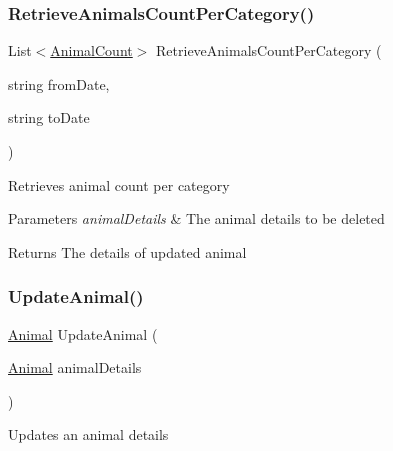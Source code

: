 \subsubsection{\texorpdfstring{Retrieve\+Animals\+Count\+Per\+Category()}{RetrieveAnimalsCountPerCategory()}}
{\footnotesize\ttfamily List$<$\hyperlink{classWildLifeTracker_1_1Models_1_1AnimalCount}{Animal\+Count}$>$ Retrieve\+Animals\+Count\+Per\+Category (\begin{DoxyParamCaption}\item[{string}]{from\+Date,  }\item[{string}]{to\+Date }\end{DoxyParamCaption})\hspace{0.3cm}{\ttfamily [inline]}}



Retrieves animal count per category 


\begin{DoxyParams}{Parameters}
{\em animal\+Details} & The animal details to be deleted\\
\hline
\end{DoxyParams}
\begin{DoxyReturn}{Returns}
The details of updated animal
\end{DoxyReturn}
\mbox{\label{classWildLifeTracker_1_1Repository_1_1AnimalRepo_a2b873c47d97ceb29023685a8c6b05e6a}} 
\subsubsection{\texorpdfstring{Update\+Animal()}{UpdateAnimal()}}
{\footnotesize\ttfamily \hyperlink{classWildLifeTracker_1_1Models_1_1Animal}{Animal} Update\+Animal (\begin{DoxyParamCaption}\item[{\hyperlink{classWildLifeTracker_1_1Models_1_1Animal}{Animal}}]{animal\+Details }\end{DoxyParamCaption})\hspace{0.3cm}{\ttfamily [inline]}}



Updates an animal details 


